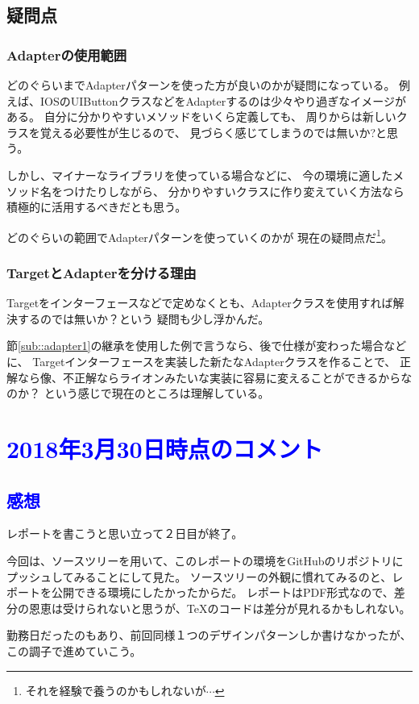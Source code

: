 \documentclass[11pt]{jsarticle}
\begin{document}
		\color{red}
		\subsection{疑問点}
			\subsubsection{Adapterの使用範囲}
				どのぐらいまでAdapterパターンを使った方が良いのかが疑問になっている。
				例えば、IOSのUIButtonクラスなどをAdapterするのは少々やり過ぎなイメージがある。
				自分に分かりやすいメソッドをいくら定義しても、
				周りからは新しいクラスを覚える必要性が生じるので、
				見づらく感じてしまうのでは無いか?と思う。
				
				しかし、マイナーなライブラリを使っている場合などに、
				今の環境に適したメソッド名をつけたりしながら、
				分かりやすいクラスに作り変えていく方法なら積極的に活用するべきだとも思う。
				
				どのぐらいの範囲でAdapterパターンを使っていくのかが
				現在の疑問点だ\footnote{それを経験で養うのかもしれないが$\cdots$}。
			\subsubsection{TargetとAdapterを分ける理由}
				Targetをインターフェースなどで定めなくとも、Adapterクラスを使用すれば解決するのでは無いか？という
				疑問も少し浮かんだ。
				
				節\ref{sub::adapter1}の継承を使用した例で言うなら、後で仕様が変わった場合などに、
				Targetインターフェースを実装した新たなAdapterクラスを作ることで、
				正解なら像、不正解ならライオンみたいな実装に容易に変えることができるからなのか？
				という感じで現在のところは理解している。
		\color{black}
		
	\section*{\textcolor{blue}{2018年3月30日時点のコメント}}
		\subsection*{\textcolor{blue}{感想}}
			レポートを書こうと思い立って２日目が終了。
			
			今回は、ソースツリーを用いて、このレポートの環境をGitHubのリポジトリにプッシュしてみることにして見た。
			ソースツリーの外観に慣れてみるのと、レポートを公開できる環境にしたかったからだ。
			レポートはPDF形式なので、差分の恩恵は受けられないと思うが、\TeX のコードは差分が見れるかもしれない。
			
			勤務日だったのもあり、前回同様１つのデザインパターンしか書けなかったが、この調子で進めていこう。
			\clearpage
			
			
			
			
			
			
			
			
			
			
			
			
			
			
			
			
			
			
			
			
			
			
			
			
			
		
\end{document}
